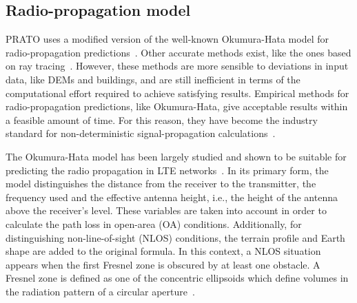 \subsection{Radio-propagation model \label{sub:04-Radio_propagation_model}}

PRATO uses a modified version of the well-known Okumura-Hata model
for radio-propagation predictions~\cite{Hata_Empirical_formula_for_propagation_loss_in_land_mobile_radio_services:1980}.
Other accurate methods exist, like the ones based on ray tracing~\cite{Corre_Three_dimensional_urban_EM_wave_propagation_model_for_radio_network_planning_and_optimization_over_large_areas:2009,Vilhar-Efficient_open_source_ray_tracing_methods_for_rural_environment:efficient}.
However, these methods are more sensible to deviations in input data,
like DEMs and buildings, and are still inefficient in terms of the
computational effort required to achieve satisfying results. Empirical
methods for radio-propagation predictions, like Okumura-Hata, give
acceptable results within a feasible amount of time. For this reason,
they have become the industry standard for non-deterministic signal-propagation
calculations~\cite{Begovic_Applicability_evaluation_of_Okumura_Ericsson_and_Winner_propagation_models_for_coverage_planning:2012,Cichon_Propagation.prediction.models:1995,Hata_Empirical_formula_for_propagation_loss_in_land_mobile_radio_services:1980,Shabbir_Comparison_of_radio_propagation_models:2011,Song_Evolved_cellular_network_planning_and_optimization_for_UMTS_and_LTE:2010}.

The Okumura-Hata model has been largely studied and shown to be suitable
for predicting the radio propagation in LTE networks~\cite{Ahmad:Studying_different_propagation_models_for_LTE_system:2012,Shabbir_Comparison_of_radio_propagation_models:2011}.
In its primary form, the model distinguishes the distance from the
receiver to the transmitter, the frequency used and the effective
antenna height, i.e., the height of the antenna above the receiver's
level. These variables are taken into account in order to calculate
the path loss in open-area (OA) conditions.
Additionally, for distinguishing non-line-of-sight (NLOS)
conditions, the terrain profile and Earth shape are added to the original
formula. In this context, a NLOS situation appears when the first
Fresnel zone is obscured by at least one obstacle. A Fresnel zone
is defined as one of the concentric ellipsoids which define volumes
in the radiation pattern of a circular aperture~\cite{Xia-Radio_propagation_characteristics_for_line_of_sight_microcellular_and_personal_communications:1993}.

